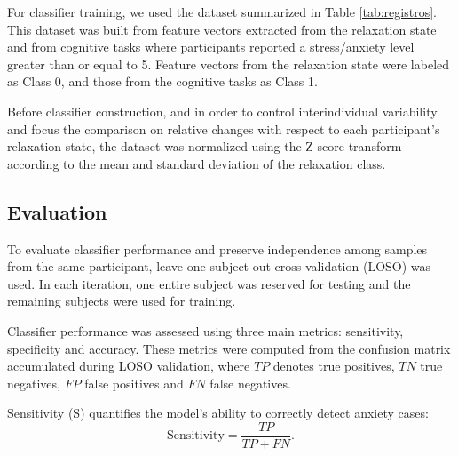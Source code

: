 \documentclass[lettersize,journal]{IEEEtran}
\begin{document}
For classifier training, we used the dataset summarized in Table \ref{tab:registros}. This dataset was built from feature vectors extracted from the relaxation state and from cognitive tasks where participants reported a stress/anxiety level greater than or equal to 5. Feature vectors from the relaxation state were labeled as Class 0, and those from the cognitive tasks as Class 1.

\FloatBarrier

\begin{table}[!htbp]
	\centering
	\caption{Dataset summary used for building anxiety detection models.}
	\label{tab:registros}
	\small
	\renewcommand{\arraystretch}{1.5}
\end{table}

\FloatBarrier

Before classifier construction, and in order to control interindividual variability and focus the comparison on relative changes with respect to each participant's relaxation state, the dataset was normalized using the Z-score transform according to the mean and standard deviation of the relaxation class.

\subsection{Evaluation}
To evaluate classifier performance and preserve independence among samples from the same participant, leave-one-subject-out cross-validation (LOSO) was used. In each iteration, one entire subject was reserved for testing and the remaining subjects were used for training.

Classifier performance was assessed using three main metrics: sensitivity, specificity and accuracy. These metrics were computed from the confusion matrix accumulated during LOSO validation, where $TP$ denotes true positives, $TN$ true negatives, $FP$ false positives and $FN$ false negatives.

Sensitivity (S) quantifies the model's ability to correctly detect anxiety cases:
\begin{equation}
	\mathrm{Sensitivity}=\frac{TP}{TP+FN}.
\end{equation}
\end{document}
